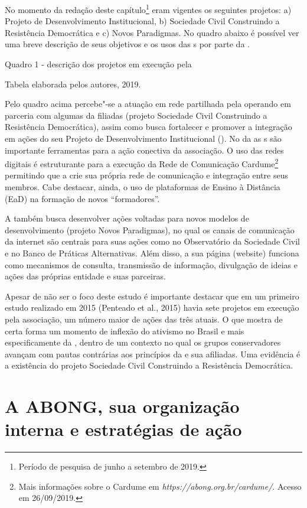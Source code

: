 No momento da redação deste capítulo\footnote{Período de pesquisa de
  junho a setembro de 2019.} eram vigentes os seguintes projetos: a)
Projeto de Desenvolvimento Institucional, b) Sociedade Civil Construindo
a Resistência Democrática e c) Novos Paradigmas. No quadro abaixo é
possível ver uma breve descrição de seus objetivos e os usos das s
por parte da .

Quadro 1 - descrição dos projetos em execução pela 

Tabela elaborada pelos autores, 2019.

Pelo quadro acima percebe"-se a atuação em rede partilhada pela 
operando em parceria com algumas da filiadas (projeto Sociedade Civil
Construindo a Resistência Democrática), assim como busca fortalecer e
promover a integração em ações do seu Projeto de Desenvolvimento
Institucional (). No  da  as s são importante ferramentas
para a ação conectiva da associação. O uso das redes digitais é
estruturante para a execução da Rede de Comunicação Cardume\footnote{Mais
  informações sobre o Cardume em
  \emph{https://abong.org.br/cardume/}.
  Acesso em 26/09/2019.} permitindo que a  crie sua própria rede de
comunicação e integração entre seus membros. Cabe destacar, ainda, o uso
de plataformas de Ensino à Distância (EaD) na formação de novos
``formadores''.

A  também busca desenvolver ações voltadas para novos modelos de
desenvolvimento (projeto Novos Paradigmas), no qual os canais de
comunicação da internet são centrais para suas ações como no
Observatório da Sociedade Civil e no Banco de Práticas Alternativas.
Além disso, a sua página (website) funciona como mecanismos de consulta,
transmissão de informação, divulgação de ideias e ações das próprias
entidade e suas parceiras.

Apesar de não ser o foco deste estudo é importante destacar que em um
primeiro estudo realizado em 2015 (Penteado et al., 2015) havia sete
projetos em execução pela associação, um número maior de ações das três
atuais. O que mostra de certa forma um momento de inflexão do ativismo
no Brasil e mais especificamente da , dentro de um contexto no qual
os grupos conservadores avançam com pautas contrárias aos princípios da
 e sua afiliadas. Uma evidência é a existência do projeto Sociedade
Civil Construindo a Resistência Democrática.

\section{A ABONG, sua organização interna e estratégias de ação}

